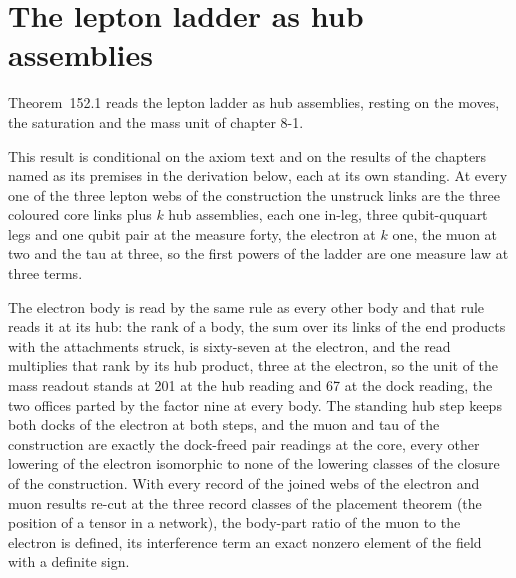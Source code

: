 \section{The lepton ladder as hub assemblies}\label{mod:V-10-lepton-ladder-as-hub-assemblies}
\label{narr:open:5-10}Theorem~152.1 reads the lepton ladder as hub assemblies, resting on the moves, the saturation and the mass unit of chapter 8-1.
\begin{chconditional}\label{box:V-10-lepton-ladder-as-hub-assemblies:1}
This result is conditional on the axiom text and on the results of the chapters named as its premises in the derivation below, each at its own standing.
At every one of the three lepton webs of the construction the unstruck links are the three coloured core links plus $k$ hub assemblies, each one in-leg, three qubit-ququart legs and one qubit pair at the measure forty, the electron at $k$ one, the muon at two and the tau at three, so the first powers of the ladder are one measure law at three terms.
\end{chconditional}
The electron body is read by the same rule as every other body and that rule reads it at its hub: the rank of a body, the sum over its links of the end products with the attachments struck, is sixty-seven at the electron, and the read multiplies that rank by its hub product, three at the electron, so the unit of the mass readout stands at 201 at the hub reading and 67 at the dock reading, the two offices parted by the factor nine at every body.
The standing hub step keeps both docks of the electron at both steps, and the muon and tau of the construction are exactly the dock-freed pair readings at the core, every other lowering of the electron isomorphic to none of the lowering classes of the closure of the construction.
With every record of the joined webs of the electron and muon results re-cut at the three record classes of the placement theorem (the position of a tensor in a network), the body-part ratio of the muon to the electron is defined, its interference term an exact nonzero element of the field with a definite sign.
